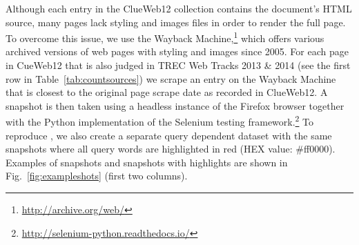 
Although each entry in the ClueWeb12 collection contains the document's HTML source, many pages lack styling and images files in order to render the full page.
To overcome this issue, we use the Wayback Machine,\footnote{\url{http://archive.org/web/}} which offers various archived versions of web pages with styling and images since 2005.
For each page in CueWeb12 that is also judged in TREC Web Tracks 2013 \& 2014 (see the first row in Table~\ref{tab:countsources})
we scrape an entry on the Wayback Machine that is closest to the original page scrape date as recorded in ClueWeb12.
A snapshot is then taken using a headless instance of the Firefox browser together with the Python implementation of the Selenium testing framework.\footnote{\url{http://selenium-python.readthedocs.io/}}
To reproduce \cite{fan2017learning}, we also create a separate query dependent dataset with the same snapshots where all query words are highlighted in red (HEX value: \#ff0000).
Examples of snapshots and snapshots with highlights are shown in Fig.~\ref{fig:exampleshots} (first two columns).

